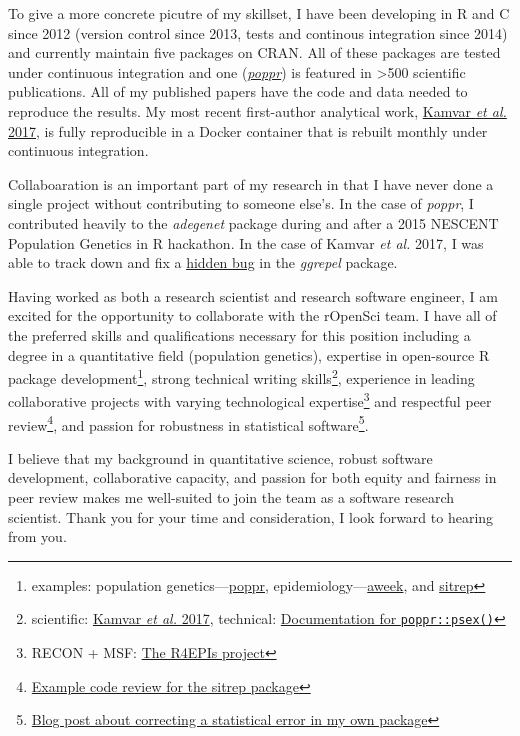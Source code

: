 To give a more concrete picutre of my skillset, I have been developing in R and
C since 2012 (version control since 2013, tests and continous integration since 
2014) and currently maintain five packages on CRAN. All of these packages are
tested under continuous integration and one
(\href{https://grunwaldlab.github.io/poppr}{\textit{poppr}}) is featured in
\textgreater500 scientific publications. All of my published papers have the
code and data needed to reproduce the results. My most recent first-author 
analytical work, \href{https://peerj.com/articles/4152/}{Kamvar \textit{et al.}
2017}, is fully reproducible in a Docker container that is rebuilt monthly under
continuous integration. 

Collaboaration is an important part of my research in that I have never done a
single project without contributing to someone else's. In the case of
\textit{poppr}, I contributed heavily to the \textit{adegenet} package during
and after a 2015 NESCENT Population Genetics in R hackathon. In the case of
Kamvar \textit{et al.} 2017, I was able to track down and fix a
\href{https://github.com/slowkow/ggrepel/issues/72}{hidden bug} in the
\textit{ggrepel} package. 

Having worked as both a research scientist and research software engineer, I am
excited for the opportunity to collaborate with the rOpenSci team. I have all
of the preferred skills and qualifications necessary for this position
including a degree in a quantitative field (population genetics), expertise in
open-source R package development\footnote{examples: population genetics---\href{https://grunwaldlab.github.io/poppr}{poppr}, epidemiology---\href{https://www.repidemicsconsortium.org/aweek}{aweek}, and
\href{https://github.com/R4EPI/sitrep}{sitrep}}, strong technical writing
skills\footnote{scientific: \href{https://peerj.com/articles/4152/}{Kamvar \textit{et al.} 2017}, technical:
\href{https://grunwaldlab.github.io/poppr/reference/psex.html}{Documentation
for \texttt{poppr::psex()}}}, experience in leading collaborative
projects with varying technological expertise\footnote{RECON + MSF: \href{https://R4EPIs.netlify.com}{The R4EPIs
project}} and respectful peer
review\footnote{\href{https://github.com/R4EPI/sitrep/pull/76}{Example code
review for the sitrep package}}, and passion for robustness in statistical
software\footnote{\href{https://zkamvar.netlify.com/post/2017-09-23-squish/squish}{Blog
post about correcting a statistical error in my own package}}.

I believe that my background in quantitative science, robust software
development, collaborative capacity, and passion for both equity and 
fairness in peer review makes me well-suited to join the team as a software
research scientist. Thank you for your time and consideration,
I look forward to hearing from you. 

